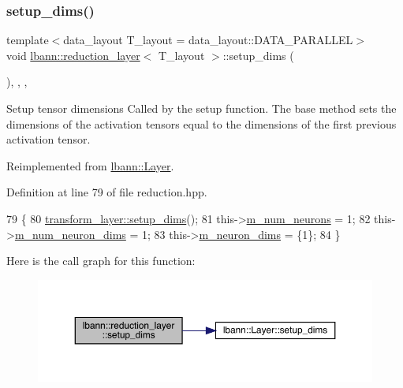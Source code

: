 \subsubsection{\texorpdfstring{setup\+\_\+dims()}{setup\_dims()}}
{\footnotesize\ttfamily template$<$data\+\_\+layout T\+\_\+layout = data\+\_\+layout\+::\+D\+A\+T\+A\+\_\+\+P\+A\+R\+A\+L\+L\+EL$>$ \\
void \hyperlink{classlbann_1_1reduction__layer}{lbann\+::reduction\+\_\+layer}$<$ T\+\_\+layout $>$\+::setup\+\_\+dims (\begin{DoxyParamCaption}{ }\end{DoxyParamCaption})\hspace{0.3cm}{\ttfamily [inline]}, {\ttfamily [override]}, {\ttfamily [protected]}, {\ttfamily [virtual]}}

Setup tensor dimensions Called by the setup function. The base method sets the dimensions of the activation tensors equal to the dimensions of the first previous activation tensor. 

Reimplemented from \hyperlink{classlbann_1_1Layer_a90fce1b06c1f2abb480e18cfe08a9746}{lbann\+::\+Layer}.



Definition at line 79 of file reduction.\+hpp.


\begin{DoxyCode}
79                              \{
80     \hyperlink{classlbann_1_1Layer_a90fce1b06c1f2abb480e18cfe08a9746}{transform\_layer::setup\_dims}();
81     this->\hyperlink{classlbann_1_1Layer_a6b5ebc8a7d9329d8a773ed787e7b41d8}{m\_num\_neurons} = 1;
82     this->\hyperlink{classlbann_1_1Layer_adfd6178d21498c9095cd947ae1eb2d6a}{m\_num\_neuron\_dims} = 1;
83     this->\hyperlink{classlbann_1_1Layer_abb34bb8031f57a483e2e327a5f229f48}{m\_neuron\_dims} = \{1\};
84   \}
\end{DoxyCode}
Here is the call graph for this function\+:\nopagebreak
\begin{figure}[H]
\begin{center}
\leavevmode
\includegraphics[width=350pt]{classlbann_1_1reduction__layer_aff2c5f6112da848908baba3645408e6e_cgraph}
\end{center}
\end{figure}


